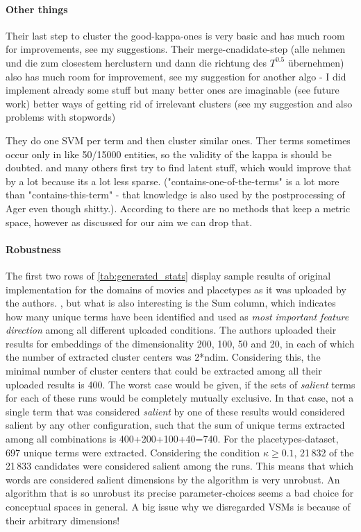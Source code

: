 \paragraph{Other things}
Their last step to cluster the good-kappa-ones is very basic and has much room for improvements, see my suggestions.
Their merge-cnadidate-step (alle nehmen und die zum closestem herclustern und dann die richtung des $T^0.5$ übernehmen) also has much room for improvement, see my suggestion for another algo - I did implement already some stuff but many better ones are imaginable (see future work)
better ways of getting rid of irrelevant clusters (see my suggestion and also problems with stopwords)

They do one SVM per term and then cluster similar ones. Ther terms sometimes occur only in like 50/15000 entities, so the validity of the kappa is should be doubted. \cite{VISR12} and many others first try to find latent stuff, which would improve that by a lot because its a lot less sparse. ("contains-one-of-the-terms" is a lot more than "contains-this-term" - that knowledge is also used by the postprocessing of Ager even though shitty.). According to \cite{Derrac2015} there are no methods that keep a metric space, however as discussed for our aim we can drop that.



\paragraph{Robustness}

The first two rows of \autoref{tab:generated_stats} display sample results of  original implementation for the domains of movies and placetypes as it was uploaded by the authors. , but what is also interesting is the Sum column, which indicates how many unique terms have been identified and used as \textit{most important feature direction} among all different uploaded conditions. The authors uploaded their results for embeddings of the dimensionality 200, 100, 50 and 20, in each of which the number of extracted cluster centers  was 2*ndim. Considering this, the minimal number of cluster centers that could be extracted among all their uploaded results is 400. The worst case would be given, if the sets of \textit{salient} terms for each of these runs would be completely mutually exclusive. In that case, not a single term that was considered \textit{salient} by one of these results would considered salient by any other configuration, such that the sum of unique terms extracted among all combinations is 400+200+100+40=740. For the placetypes-dataset, 697 unique terms were extracted. Considering the condition $\kappa \geq 0.1$, 21\,832 of the 21\,833 candidates were considered salient among the runs. This means that which words are considered salient dimensions by the algorithm is very unrobust. 
An algorithm that is so unrobust \wrt its precise parameter-choices seems a bad choice for conceptual spaces in general. A big issue why we disregarded VSMs is because of their arbitrary dimensions!


